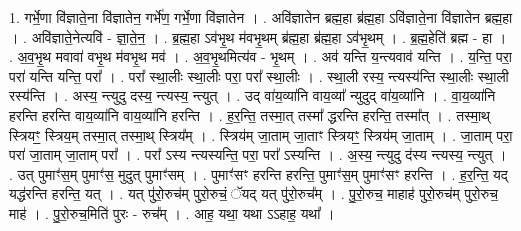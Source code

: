 \documentclass[17pt]{extarticle}
\begin{document}
1. गर्भे॒णा वि॑ज्ञाते॒ना वि॑ज्ञातेन॒ गर्भे॑ण॒ गर्भे॒णा वि॑ज्ञातेन । . अवि॑ज्ञातेन ब्रह्म॒हा ब्र॑ह्म॒हा ऽवि॑ज्ञाते॒ना वि॑ज्ञातेन ब्रह्म॒हा । . अवि॑ज्ञाते॒नेत्यवि॑ - ज्ञा॒ते॒न॒ । . ब्र॒ह्म॒हा ऽव॑भृ॒थ म॑वभृ॒थम् ब्र॑ह्म॒हा ब्र॑ह्म॒हा ऽव॑भृ॒थम् । . ब्र॒ह्म॒हेति॑ ब्रह्म - हा । . अ॒व॒भृ॒थ मवावा॑ वभृ॒थ म॑वभृ॒थ मव॑ । . अ॒व॒भृ॒थमित्य॑व - भृ॒थम् । . अव॑ यन्ति य॒न्त्यवाव॑ यन्ति । . य॒न्ति॒ परा॒ परा॑ यन्ति यन्ति॒ परा᳚ । . परा᳚ स्था॒लीः स्था॒लीः परा॒ परा᳚ स्था॒लीः । . स्था॒ली रस्य॒ न्त्यस्य॑न्ति स्था॒लीः स्था॒ली रस्य॑न्ति । . अस्य॒ न्त्युदु दस्य॒ न्त्यस्य॒ न्त्युत् । . उद् वा॑य॒व्या॑नि वाय॒व्या᳚ न्युदुद् वा॑य॒व्या॑नि । . वा॒य॒व्या॑नि हरन्ति हरन्ति वाय॒व्या॑नि वाय॒व्या॑नि हरन्ति । . ह॒र॒न्ति॒ तस्मा॒त् तस्मा᳚ द्धरन्ति हरन्ति॒ तस्मा᳚त् । . तस्मा॒थ् स्त्रियꣳ॒॒ स्त्रिय॒म् तस्मा॒त् तस्मा॒थ् स्त्रिय᳚म् । . स्त्रिय॑म् जा॒ताम् जा॒ताꣳ स्त्रियꣳ॒॒ स्त्रिय॑म् जा॒ताम् । . जा॒ताम् परा॒ परा॑ जा॒ताम् जा॒ताम् परा᳚ । . परा᳚ ऽस्य न्त्यस्यन्ति॒ परा॒ परा᳚ ऽस्यन्ति । . अ॒स्य॒ न्त्युदु द॑स्य न्त्यस्य॒ न्त्युत् । . उत् पुमाꣳ॑स॒म् पुमाꣳ॑स॒ मुदुत् पुमाꣳ॑सम् । . पुमाꣳ॑सꣳ हरन्ति हरन्ति॒ पुमाꣳ॑स॒म् पुमाꣳ॑सꣳ हरन्ति । . ह॒र॒न्ति॒ यद् यद्ध॑रन्ति हरन्ति॒ यत् । . यत् पु॑रो॒रुच॑म् पुरो॒रुचं॒ ॅयद् यत् पु॑रो॒रुच᳚म् । . पु॒रो॒रुच॒ माहाह॑ पुरो॒रुच॑म् पुरो॒रुच॒ माह॑ । . पु॒रो॒रुच॒मिति॑ पुरः - रुच᳚म् । . आह॒ यथा॒ यथा ऽऽहाह॒ यथा᳚ । \newline
\end{document}
